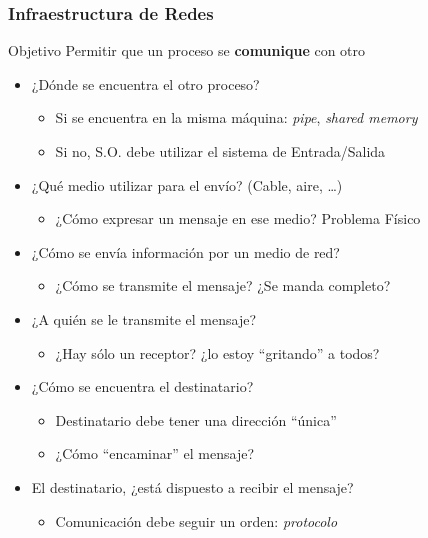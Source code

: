 \documentclass[letter]{beamer}
\begin{document}
\begin{frame}
  \frametitle{Infraestructura de Redes}

  \begin{block}{Objetivo}
    Permitir que un proceso se {\bf comunique} con otro
  \end{block}
  
  \begin{itemize}
    \item ¿Dónde se encuentra el otro proceso?
      \begin{itemize}
        \item Si se encuentra en la misma máquina: {\em pipe}, {\em shared memory}
        \item Si no, S.O. debe utilizar el sistema de Entrada/Salida
      \end{itemize}
    \item ¿Qué medio utilizar para el envío? (Cable, aire, \ldots)
      \begin{itemize}
        \item ¿Cómo expresar un mensaje en ese medio? Problema Físico
      \end{itemize}
    \item ¿Cómo se envía información por un medio de red?
      \begin{itemize}
        \item ¿Cómo se transmite el mensaje? ¿Se manda completo?
      \end{itemize}
    \item ¿A quién se le transmite el mensaje?
      \begin{itemize}
        \item ¿Hay sólo un receptor? ¿lo estoy ``gritando'' a todos?
      \end{itemize}
    \item ¿Cómo se encuentra el destinatario?
      \begin{itemize}
        \item Destinatario debe tener una dirección ``única''
        \item ¿Cómo ``encaminar'' el mensaje?
      \end{itemize}
    \item El destinatario, ¿está dispuesto a recibir el mensaje?
      \begin{itemize}
        \item Comunicación debe seguir un orden: {\em protocolo}
      \end{itemize}
  \end{itemize}

\end{frame}
\end{document}
